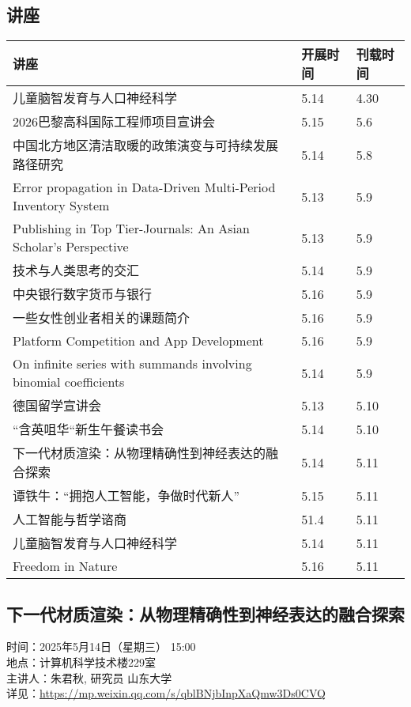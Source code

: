 \documentclass[letterpaper, 12pt]{article}
\begin{document}
\begin{multicols}{2}
\pagebreak

\section{讲座}
\begin{tabular}{|>{\centering\arraybackslash}m{}|m{}|m{}|}
    \hline
    讲座 & 开展时间 & 刊载时间\\
    \hline\hline
    儿童脑智发育与人口神经科学 & 5.14 & 4.30\\\hline
    2026巴黎高科国际工程师项目宣讲会 & 5.15 & 5.6\\\hline
    中国北方地区清洁取暖的政策演变与可持续发展路径研究 & 5.14 & 5.8\\\hline
    Error propagation in Data-Driven Multi-Period Inventory System & 5.13 & 5.9\\\hline
    Publishing in Top Tier-Journals: An Asian Scholar’s Perspective & 5.13 & 5.9\\\hline
    技术与人类思考的交汇 & 5.14 & 5.9\\\hline
    中央银行数字货币与银行 & 5.16 & 5.9\\\hline
    一些女性创业者相关的课题简介 & 5.16 & 5.9\\\hline
    Platform Competition and App Development & 5.16 & 5.9\\\hline
    On infinite series with summands involving binomial coefficients & 5.14 & 5.9\\\hline
    德国留学宣讲会 & 5.13 & 5.10\\\hline
    “含英咀华“新生午餐读书会 & 5.14 & 5.10\\\hline
    下一代材质渲染：从物理精确性到神经表达的融合探索 & 5.14 & 5.11\\\hline
    谭铁牛：“拥抱人工智能，争做时代新人” & 5.15 & 5.11\\\hline
    人工智能与哲学谘商 & 51.4 & 5.11\\\hline
    儿童脑智发育与人口神经科学 & 5.14 & 5.11\\\hline
    Freedom in Nature & 5.16 & 5.11\\\hline
    \end{tabular}
\subsection{下一代材质渲染：从物理精确性到神经表达的融合探索} %
时间：2025年5月14日（星期三） 15:00
\\地点：计算机科学技术楼229室
\\主讲人：朱君秋, 研究员 山东大学
\\详见：\url{https://mp.weixin.qq.com/s/qblBNjbInpXaQmw3Ds0CVQ}


\end{multicols}
\end{document}
